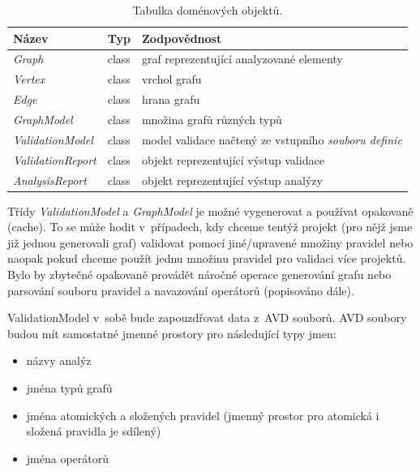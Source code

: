 \begin{table}[h]
  \caption{Tabulka doménových objektů. \label{design-domain_object_table}}
  \begin{center}
    \begin{tabular}{| l | c | p{8cm} |}
      \hline
      \textbf{Název} & \textbf{Typ} & \textbf{Zodpovědnost} \\
      \hline
      \hline
      \emph{Graph} & class & graf reprezentující analyzované elementy \\ \hline
      \emph{Vertex} & class &  vrchol grafu \\ \hline
      \emph{Edge} & class & hrana grafu \\ \hline
      \emph{GraphModel} & class & množina grafů různých typů \\ \hline
      \hline
      \emph{ValidationModel} & class & model validace načtený ze vstupního \emph{souboru definic} \\ \hline
      \hline
      \emph{ValidationReport} & class &  objekt reprezentující výstup validace\\ \hline
      \emph{AnalysisReport} & class & objekt reprezentující výstup analýzy \\ \hline
    \end{tabular}
  \end{center}

\end{table}

Třídy \emph{ValidationModel} a \emph{GraphModel} je možné vygenerovat a používat opakovaně (cache). To se může hodit v~případech, kdy chceme tentýž projekt (pro nějž jsme již jednou generovali graf) validovat pomocí jiné/upravené množiny pravidel nebo naopak pokud chceme použít jednu množinu pravidel pro validaci více projektů. Bylo by zbytečné opakovaně provádět náročné operace generování grafu nebo parsování souboru pravidel a navazování operátorů (popisováno dále).

ValidationModel v~sobě bude zapouzdřovat data z~AVD souborů. AVD soubory budou mít samostatné jmenné prostory pro následující typy jmen:

\begin{itemize}
\item názvy analýz
\item jména typů grafů
\item jména atomických a složených pravidel (jmenný prostor pro atomická i složená pravidla je sdílený)
\item jména operátorů
\end{itemize}

